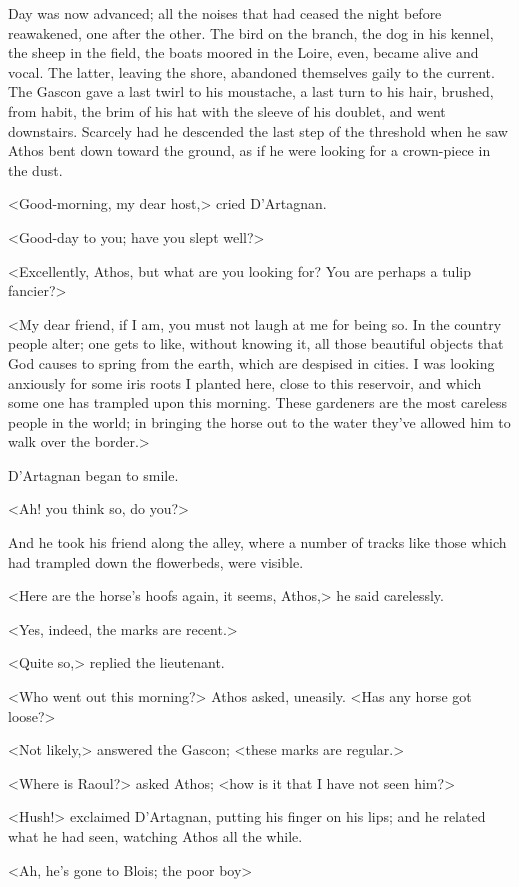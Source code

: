 Day was now advanced; all the noises that had ceased the night before reawakened, one after the other. The bird on the branch, the dog in his kennel, the sheep in the field, the boats moored in the Loire, even, became alive and vocal. The latter, leaving the shore, abandoned themselves gaily to the current. The Gascon gave a last twirl to his moustache, a last turn to his hair, brushed, from habit, the brim of his hat with the sleeve of his doublet, and went downstairs. Scarcely had he descended the last step of the threshold when he saw Athos bent down toward the ground, as if he were looking for a crown-piece in the dust.

<Good-morning, my dear host,> cried D'Artagnan.

<Good-day to you; have you slept well?>

<Excellently, Athos, but what are you looking for? You are perhaps a tulip fancier?>

<My dear friend, if I am, you must not laugh at me for being so. In the country people alter; one gets to like, without knowing it, all those beautiful objects that God causes to spring from the earth, which are despised in cities. I was looking anxiously for some iris roots I planted here, close to this reservoir, and which some one has trampled upon this morning. These gardeners are the most careless people in the world; in bringing the horse out to the water they've allowed him to walk over the border.>

D'Artagnan began to smile.

<Ah! you think so, do you?>

And he took his friend along the alley, where a number of tracks like those which had trampled down the flowerbeds, were visible.

<Here are the horse's hoofs again, it seems, Athos,> he said carelessly.

<Yes, indeed, the marks are recent.>

<Quite so,> replied the lieutenant.

<Who went out this morning?> Athos asked, uneasily. <Has any horse got loose?>

<Not likely,> answered the Gascon; <these marks are regular.>

<Where is Raoul?> asked Athos; <how is it that I have not seen him?>

<Hush!> exclaimed D'Artagnan, putting his finger on his lips; and he related what he had seen, watching Athos all the while.

<Ah, he's gone to Blois; the poor boy\longdash>

